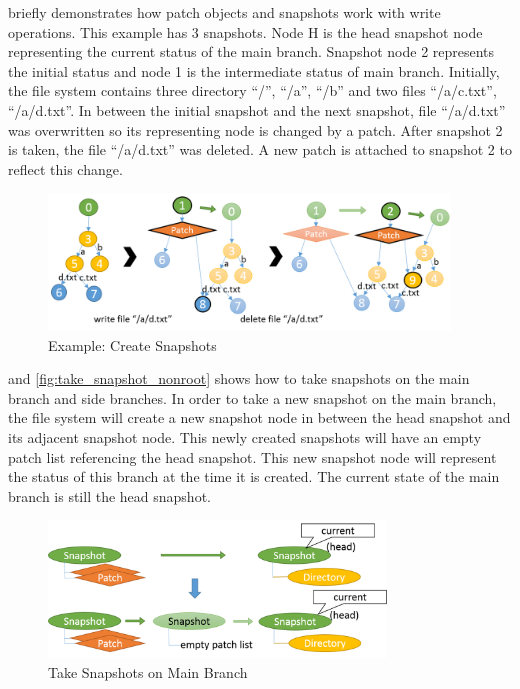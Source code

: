 	 briefly demonstrates how patch objects and snapshots work with write operations. This example has 3 snapshots. Node H is the head snapshot node representing the current status of the main branch. Snapshot node 2 represents the initial status and node 1 is the intermediate status of main branch. Initially, the file system contains three directory ``/'', ``/a'', ``/b'' and two files ``/a/c.txt'', ``/a/d.txt''. In between the initial snapshot and the next snapshot, file ``/a/d.txt'' was overwritten so its representing node is changed by a patch. After snapshot 2 is taken, the file ``/a/d.txt'' was deleted. A new patch is attached to snapshot 2 to reflect this change.

\begin{figure}[t]
\centering
\includegraphics[width=0.95\textwidth]{Chapter-4/figs/fig26.png}
\caption{Example: Create Snapshots}
\label{fig:create_snapshots}
\end{figure}

     and \ref{fig:take_snapshot_nonroot} shows how to take snapshots on the main branch and side branches. In order to take a new snapshot on the main branch, the file system will create a new snapshot node in between the head snapshot and its adjacent snapshot node. This newly created snapshots will have an empty patch list referencing the head snapshot. This new snapshot node will represent the status of this branch at the time it is created. The current state of the main branch is still the head snapshot.

\begin{figure}[t]
\centering
\includegraphics[width=0.8\textwidth]{Chapter-4/figs/fig20.png}
\caption{Take Snapshots on Main Branch}
\label{fig:take_snapshot_root}
\end{figure}
    
